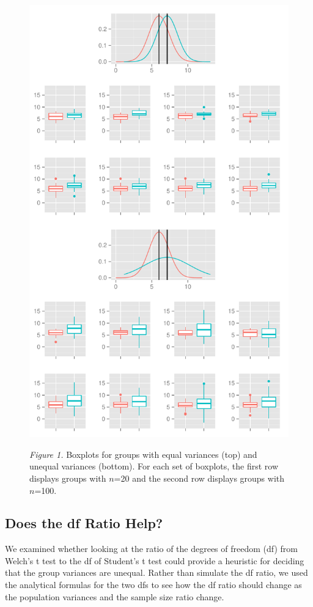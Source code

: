 \documentclass[man,a4paper,noextraspace,apacite]{apa6}
\begin{document}
\begin{figure}
\includegraphics{WelchManuscript-MASTER-varEqualBoxplots}

\textit{Figure 1.} Boxplots for groups with equal variances (top) and unequal variances (bottom). For each set of boxplots, the first row displays groups with $n$=20 and the second row displays groups with $n$=100.
\end{figure}

\subsection{Does the df Ratio Help?}
    We examined whether looking at the ratio of the degrees of freedom (df) from Welch's t test to the df of Student's t test could provide a heuristic for deciding that the group variances are unequal. Rather than simulate the df ratio, we used the analytical formulas for the two dfs to see how the df ratio should change as the population variances and the sample size ratio change.
\end{document}
